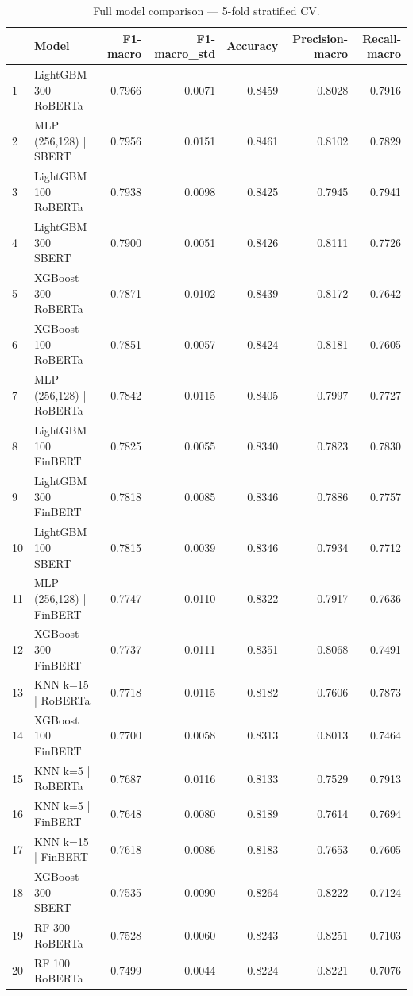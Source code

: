 \begin{table}
\caption{Full model comparison — 5-fold stratified CV.}
\label{tab:results}
\begin{tabular}{llrrrrr}
\toprule
 & Model & F1-macro & F1-macro_std & Accuracy & Precision-macro & Recall-macro \\
\midrule
1 & LightGBM 300 | RoBERTa & 0.7966 & 0.0071 & 0.8459 & 0.8028 & 0.7916 \\
2 & MLP (256,128) | SBERT & 0.7956 & 0.0151 & 0.8461 & 0.8102 & 0.7829 \\
3 & LightGBM 100 | RoBERTa & 0.7938 & 0.0098 & 0.8425 & 0.7945 & 0.7941 \\
4 & LightGBM 300 | SBERT & 0.7900 & 0.0051 & 0.8426 & 0.8111 & 0.7726 \\
5 & XGBoost 300 | RoBERTa & 0.7871 & 0.0102 & 0.8439 & 0.8172 & 0.7642 \\
6 & XGBoost 100 | RoBERTa & 0.7851 & 0.0057 & 0.8424 & 0.8181 & 0.7605 \\
7 & MLP (256,128) | RoBERTa & 0.7842 & 0.0115 & 0.8405 & 0.7997 & 0.7727 \\
8 & LightGBM 100 | FinBERT & 0.7825 & 0.0055 & 0.8340 & 0.7823 & 0.7830 \\
9 & LightGBM 300 | FinBERT & 0.7818 & 0.0085 & 0.8346 & 0.7886 & 0.7757 \\
10 & LightGBM 100 | SBERT & 0.7815 & 0.0039 & 0.8346 & 0.7934 & 0.7712 \\
11 & MLP (256,128) | FinBERT & 0.7747 & 0.0110 & 0.8322 & 0.7917 & 0.7636 \\
12 & XGBoost 300 | FinBERT & 0.7737 & 0.0111 & 0.8351 & 0.8068 & 0.7491 \\
13 & KNN k=15 | RoBERTa & 0.7718 & 0.0115 & 0.8182 & 0.7606 & 0.7873 \\
14 & XGBoost 100 | FinBERT & 0.7700 & 0.0058 & 0.8313 & 0.8013 & 0.7464 \\
15 & KNN k=5 | RoBERTa & 0.7687 & 0.0116 & 0.8133 & 0.7529 & 0.7913 \\
16 & KNN k=5 | FinBERT & 0.7648 & 0.0080 & 0.8189 & 0.7614 & 0.7694 \\
17 & KNN k=15 | FinBERT & 0.7618 & 0.0086 & 0.8183 & 0.7653 & 0.7605 \\
18 & XGBoost 300 | SBERT & 0.7535 & 0.0090 & 0.8264 & 0.8222 & 0.7124 \\
19 & RF 300 | RoBERTa & 0.7528 & 0.0060 & 0.8243 & 0.8251 & 0.7103 \\
20 & RF 100 | RoBERTa & 0.7499 & 0.0044 & 0.8224 & 0.8221 & 0.7076 \\

\end{tabular}
\end{table}
